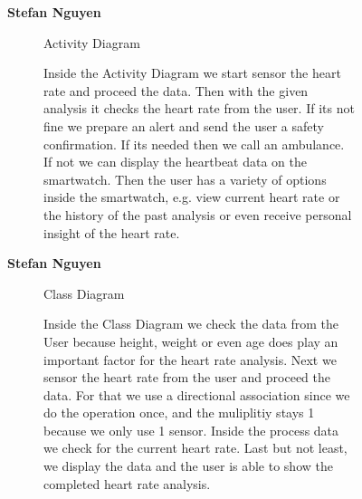 \documentclass{article}
\begin{document}
	\begin{figure}[htbp]
		\textbf{Stefan Nguyen}
		\centering
		\begin{subfigure}{\textwidth}
			\resizebox{\textwidth}{!}{}
			\caption{Activity Diagram}
		\end{subfigure}
		\begin{subfigure}{\textwidth}
			Inside the Activity Diagram we start sensor the heart rate and proceed the data. Then with the given analysis it checks the 
			heart rate from the user. If its not fine we prepare an alert and send the user a safety confirmation. If its needed then we call an ambulance. If not 
			we can display the heartbeat data on the smartwatch. Then the user has a variety of options inside the smartwatch, e.g. 
			view current heart rate or the history of the past analysis or even receive personal insight of the heart rate. 
		\end{subfigure}
	\end{figure}


	\begin{figure}[htbp]
		\textbf{Stefan Nguyen}
		\centering
		\begin{subfigure}{\textwidth}
			\resizebox{\textwidth}{!}{}
			\caption{Class Diagram}
		\end{subfigure}
		\begin{subfigure}{\textwidth}
			Inside the Class Diagram we check the data from the User because height, weight or even age does play an important factor
			for the heart rate analysis. Next we sensor the heart rate from the user and proceed the data. For that we use a directional 
			association since we do the operation once, and the muliplitiy stays 1 because we only use 1 sensor. Inside the process data we check for 
			the current heart rate. Last but not least, we display the data and the user is able to show the completed heart rate 
			analysis. 
		\end{subfigure}
	\end{figure}
\end{document}

